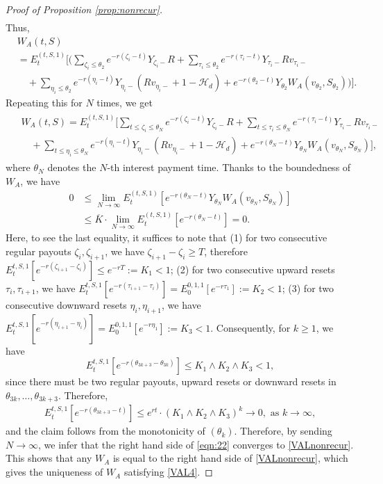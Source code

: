\documentclass[11pt]{article}%
\numberwithin{equation}{section}
\theoremstyle{plain}
\begin{document}
\begin{appendices}
\begin{proof}[Proof of Proposition \ref{prop:nonrecur}]
\begin{align*}
	\end{align*}
	Thus,
	\begin{align*}
	&W_A(t,S) \\
	&=E_t^{(t,S,1)}\Bigg[\Bigg(\sum_{\zeta_i\le\theta_2}e^{-r(\zeta_i-t)}Y_{\zeta_i-}R+\sum_{\tau_i\le\theta_2}e^{-r(\tau_i-t)}Y_{\tau_i-}Rv_{\tau_i-}\\
	&\quad+\sum_{\eta_i\le\theta_2}e^{-r(\eta_i-t)}Y_{\eta_i-}(Rv_{\eta_i-}+1-\mathcal{H}_d)+e^{-r(\theta_2-t)}Y_{\theta_2} W_A(v_{\theta_2},S_{\theta_2})\Bigg)\Bigg].
	\end{align*}
	Repeating this for $N$ times, we get
	\begin{align}\label{eqn:22}
	\begin{split}
	&W_A(t,S)=E_t^{(t,S,1)}\Bigg[\sum_{t\le \zeta_i\le\theta_N}e^{-r(\zeta_i-t)}Y_{\zeta_i-}R+\sum_{t\le \tau_i\le \theta_N}e^{-r(\tau_i-t)}Y_{\tau_i-}Rv_{\tau_i-}\\
	&\quad+\sum_{t\le\eta_i\le \theta_N}e^{-r(\eta_i-t)}Y_{\eta_i-}(Rv_{\eta_i-}+1-\mathcal{H}_d)+e^{-r(\theta_N-t)}Y_{\theta_N}W_A(v_{\theta_N},S_{\theta_N})\Bigg],
	\end{split}
	\end{align}
	where $\theta_N$ denotes the $N$-th interest payment time. Thanks to the boundedness of $W_A$, we have
	\begin{align*}
	0&\le \lim_{N\to\infty}E_t^{(t,S,1)}\left[e^{-r(\theta_N-t)}Y_{\theta_N}W_A(v_{\theta_N},S_{\theta_N})\right] \\
	&\le \overline{K}\cdot\lim_{N\to\infty}E_t^{(t,S,1)}\left[e^{-r(\theta_N-t)}\right]=0.
	\end{align*}
	Here, to see the last equality, it suffices to note that (1) for two consecutive regular payouts $\zeta_i,\zeta_{i+1}$, we have $\zeta_{i+1}-\zeta_{i}\ge T$, therefore $E_t^{t,S,1}\left[e^{-r(\zeta_{i+1}-\zeta_i)}\right]\le e^{-rT}:=K_1<1$; (2) for two consecutive upward resets $\tau_i,\tau_{i+1}$, we have $E_t^{t,S,1}\left[e^{-r(\tau_{i+1}-\tau_i)}\right]=E_0^{0,1,1}\left[e^{-r\tau_1}\right]:=K_2<1$; (3) for two consecutive downward resets $\eta_i,\eta_{i+1}$, we have $E_t^{t,S,1}\left[e^{-r(\eta_{i+1}-\eta_i)}\right]=E_0^{0,1,1}\left[e^{-r\eta_1}\right]:=K_3<1$. Consequently, for $k\ge 1$, we have $$E_t^{t,S,1}\left[e^{-r(\theta_{3k+3}-\theta_{3k})}\right]\le K_1\land K_2\land K_3<1,$$
	since there must be two regular payouts, upward resets or downward resets in $\theta_{3k},\ldots,\theta_{3k+3}$. Therefore,
	\begin{align*}
		E_t^{t,S,1}\left[e^{-r(\theta_{3k+3}-t)}\right]\le e^{rt}\cdot(K_1\land K_2\land K_3)^k\to 0,\text{ as }k\to\infty,
	\end{align*}
	and the claim follows from the monotonicity of $(\theta_k)$. Therefore, by sending $N\to\infty$, we infer that the right hand side of \eqref{eqn:22} converges to \eqref{VALnonrecur}. This shows that any $W_A$ is equal to the right hand side of \eqref{VALnonrecur}, which gives the uniqueness of $W_A$ satisfying \eqref{VAL4}.
\end{proof}



\end{appendices}
\end{document}
